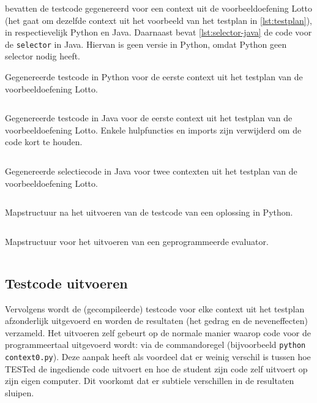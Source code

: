  bevatten de testcode gegenereerd voor een context uit de voorbeeldoefening Lotto (het gaat om dezelfde context uit het voorbeeld van het testplan in \cref{lst:testplan}), in respectievelijk Python en Java.
Daarnaast bevat \cref{lst:selector-java} de code voor de \texttt{selector} in Java.
Hiervan is geen versie in Python, omdat Python geen selector nodig heeft.

\begin{listing}
    \caption{Gegenereerde testcode in Python voor de eerste context uit het testplan van de voorbeeldoefening Lotto.}
    \label{lst:generated-context-python}
    \inputminted{python}{code/generated-context-1.py}
\end{listing}

\begin{listing}
    \caption{
        Gegenereerde testcode in Java voor de eerste context uit het testplan van de voorbeeldoefening Lotto.
        Enkele hulpfuncties en imports zijn verwijderd om de code kort te houden.
    }
    \label{lst:generated-context-java}
    \inputminted{java}{code/generated-context-1.java}
\end{listing}

\begin{listing}
    \caption{Gegenereerde selectiecode in Java voor twee contexten uit het testplan van de voorbeeldoefening Lotto.}
    \label{lst:selector-java}
    \inputminted{java}{code/Selector.java}
\end{listing}

\begin{listing}
    \caption{Mapstructuur na het uitvoeren van de testcode van een oplossing in Python.}
    \label{lst:mapstructuur}
    \inputminted{text}{code/dir-listing.txt}
\end{listing}

\begin{listing}
    \caption{Mapstructuur voor het uitvoeren van een geprogrammeerde evaluator.}
    \label{lst:mapstructuur-evaluator}
    \inputminted{text}{code/dir-listing-eval.txt}
\end{listing}

\subsection{Testcode uitvoeren}\label{subsec:testcode-uitvoeren}

Vervolgens wordt de (gecompileerde) testcode voor elke context uit het testplan afzonderlijk uitgevoerd en worden de resultaten (het gedrag en de neveneffecten) verzameld.
Het uitvoeren zelf gebeurt op de normale manier waarop code voor de programmeertaal uitgevoerd wordt: via de commandoregel (bijvoorbeeld \texttt{python context0.py}).
Deze aanpak heeft als voordeel dat er weinig verschil is tussen hoe TESTed de ingediende code uitvoert en hoe de student zijn code zelf uitvoert op zijn eigen computer.
Dit voorkomt dat er subtiele verschillen in de resultaten sluipen.

